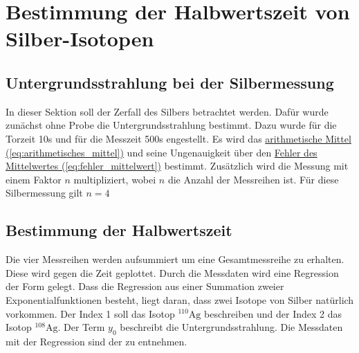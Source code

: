 \newpage

\section{Bestimmung der Halbwertszeit von Silber-Isotopen}
\label{sec:A1}
\subsection{Untergrundsstrahlung bei der Silbermessung}
In dieser Sektion soll der Zerfall des Silbers betrachtet werden. Dafür wurde zunächst ohne Probe die Untergrundsstrahlung bestimmt. Dazu wurde für die Torzeit 10s und für die Messzeit 500s engestellt. Es wird das \hyperref[eq:arithmetisches_mittel]{arithmetische Mittel (\ref*{eq:arithmetisches_mittel})} und seine Ungenauigkeit über den \hyperref[eq:fehler_mittelwert]{Fehler des Mittelwertes (\ref*{eq:fehler_mittelwert})} bestimmt. 
Zusätzlich wird die Messung mit einem Faktor $n$ multipliziert, wobei $n$ die Anzahl der Messreihen ist. Für diese Silbermessung gilt $n=4$ 

\subsection{Bestimmung der Halbwertszeit}
Die vier Messreihen werden aufsummiert um eine Gesamtmessreihe zu erhalten. Diese wird gegen die Zeit geplottet. Durch die Messdaten wird eine Regression der Form
gelegt. Dass die Regression aus einer Summation zweier Exponentialfunktionen besteht, liegt daran, dass zwei Isotope von Silber natürlich vorkommen. 
Der Index 1 soll das Isotop $^{110}\mathrm{Ag}$ beschreiben und der Index 2 das Isotop $^{108}\mathrm{Ag}$. Der Term $y_0$ beschreibt die Untergrundsstrahlung.
Die Messdaten mit der Regression sind der  zu entnehmen. 

